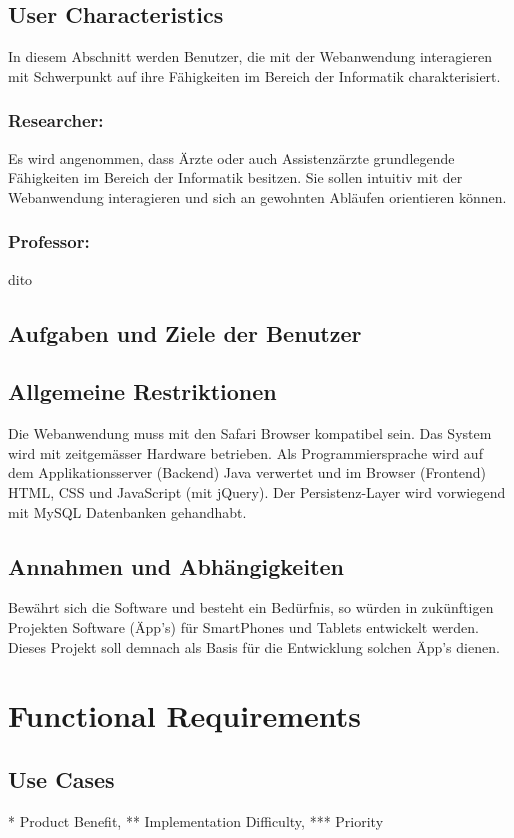 \documentclass[a4paper]{srs}
\begin{document}
\subsection{User Characteristics}
In diesem Abschnitt werden Benutzer, die mit der Webanwendung interagieren mit Schwerpunkt auf ihre Fähigkeiten im Bereich der Informatik charakterisiert.
	\subsubsection{Researcher:}
Es wird angenommen, dass Ärzte oder auch Assistenzärzte grundlegende Fähigkeiten im Bereich der Informatik besitzen. Sie sollen intuitiv mit der Webanwendung interagieren und sich an gewohnten Abläufen orientieren können.
	\subsubsection{Professor:}
dito

\subsection{Aufgaben und Ziele der Benutzer}

\subsection{Allgemeine Restriktionen}
Die Webanwendung muss mit den Safari Browser kompatibel sein.
Das System wird mit zeitgemässer Hardware betrieben.
Als Programmiersprache wird auf dem Applikationsserver (Backend) Java verwertet und im Browser (Frontend) HTML, CSS und JavaScript (mit jQuery). Der Persistenz-Layer wird vorwiegend mit MySQL Datenbanken gehandhabt.

\subsection{Annahmen und Abhängigkeiten}
Bewährt sich die Software und besteht ein Bedürfnis, so würden in zukünftigen Projekten Software (Äpp's) für SmartPhones und Tablets entwickelt werden. Dieses Projekt soll demnach als Basis für die Entwicklung solchen Äpp's dienen.

	\section{Functional Requirements}

\subsection{Use Cases}
* Product Benefit, ** Implementation Difficulty, *** Priority
\end{document}
